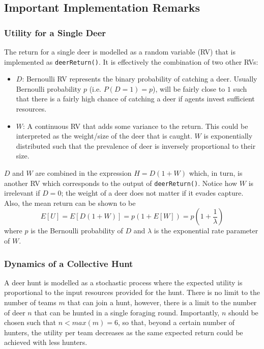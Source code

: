 \newpage
\subsection{Important Implementation Remarks}
\subsubsection{Utility for a Single Deer}
The return for a single deer is modelled as a random variable (RV) that is implemented as \texttt{deerReturn()}. It is effectively the combination of two other RVs:
\begin{itemize}
    \item $D$: Bernoulli RV represents the binary probability of catching a deer. Usually Bernoulli probability $p$ (i.e. $P(D=1) = p$), will be fairly close to $1$ such that there is a fairly high chance of catching a deer if agents invest sufficient resources.
    \item $W$: A continuous RV that adds some variance to the return. This could be interpreted as the weight/size of the deer that is caught. $W$ is exponentially distributed such that the prevalence of deer is inversely proportional to their size.
\end{itemize}

$D$ and $W$ are combined in the expression $H = D(1+W)$ which, in turn, is another RV which corresponds to the output of \texttt{deerReturn()}. Notice how $W$ is irrelevant if $D=0$; the weight of a deer does not matter if it evades capture. Also, the mean return can be shown to be $$E[U] = E[D(1+W)] = p(1+E[W]) = p(1+\frac{1}{\lambda})$$ where $p$ is the Bernoulli probability of $D$ and $\lambda$ is the exponential rate parameter of $W$.

\subsubsection{Dynamics of a Collective Hunt}

A deer hunt is modelled as a stochastic process where the expected utility is proportional to the input resources provided for the hunt. There is no limit to the number of teams $m$ that can join a hunt, however, there is a limit to the number of deer $n$ that can be hunted in a single foraging round. Importantly, $n$ should be chosen such that $n < max(m) = 6$, so that, beyond a certain number of hunters, the utility per team decreases as the same expected return could be achieved with less hunters. 

